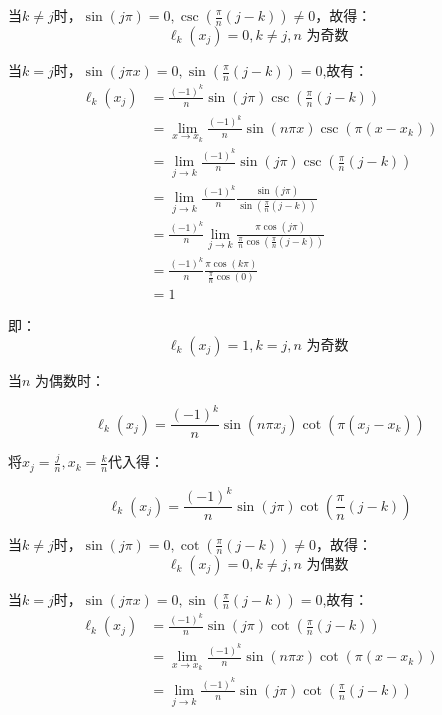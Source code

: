 \documentclass[12pt,a4paper,UTF8]{ctexart}
\theoremstyle{nonumberplain}
\begin{document}
\begin{enumerate}
\begin{enumerate}
\par 当$k \neq j$时，$\sin (j \pi )=0,\csc \left(\frac{\pi}{n}\left(j-k\right)\right)\neq 0$，故得：
$$\ell_{k}\left(x_{j}\right)=0,k \neq j,n \text { 为奇数 }$$
\par 当$k=j$时，$\sin (j \pi x)=0,\sin \left(\frac{\pi}{n}\left(j-k\right)\right)= 0$,故有：
$$\begin{aligned}\ell_{k}\left(x_{j}\right) &=\frac{(-1)^{k}}{n} \sin (j \pi ) \csc \left(\frac{\pi}{n}\left(j-k\right)\right)\\
  &=\lim_{x \to x_{k}}\frac{(-1)^{k}}{n} \sin (n \pi x) \csc \left(\pi\left(x-x_{k}\right)\right)\\
  &=\lim_{j \to k}  \frac{(-1)^{k}}{n} \sin (j \pi ) \csc \left(\frac{\pi}{n}\left(j-k\right)\right)\\
  &=\lim_{j \to k}\frac{(-1)^{k}}{n} \frac{\sin (j \pi )}{ \sin \left(\frac{\pi}{n}\left(j-k\right)\right)}\\
  &=\frac{(-1)^{k}}{n}\lim_{j \to k}\frac{\pi \cos(j\pi)}{\frac{\pi}{n}\cos\left(\frac{\pi}{n}\left(j-k\right)\right)}\\
  &=\frac{(-1)^{k}}{n}\frac{\pi \cos(k\pi)}{\frac{\pi}{n}\cos\left(0\right)}\\
  &=1
\end{aligned}
$$
\par 即：
$$\ell_{k}\left(x_{j}\right)=1,k = j,n \text { 为奇数 }$$
\par 当$n$ 为偶数时：
\par $$\ell_{k}\left(x_{j}\right)=\frac{(-1)^{k}}{n} \sin (n \pi x_{j}) \cot \left(\pi\left(x_{j}-x_{k}\right)\right)$$
\par 将$x_{j}=\frac{j}{n},x_{k}=\frac{k}{n}$代入得：
\par $$\ell_{k}\left(x_{j}\right)=\frac{(-1)^{k}}{n} \sin (j \pi ) \cot \left(\frac{\pi}{n}\left(j-k\right)\right)$$
\par 当$k \neq j$时，$\sin (j \pi )=0,\cot \left(\frac{\pi}{n}\left(j-k\right)\right)\neq 0$，故得：
$$\ell_{k}\left(x_{j}\right)=0,k \neq j, n \text { 为偶数 }$$
\par 当$k=j$时，$\sin (j \pi x)=0,\sin \left(\frac{\pi}{n}\left(j-k\right)\right)= 0$,故有：
$$\begin{aligned}\ell_{k}\left(x_{j}\right) &=\frac{(-1)^{k}}{n} \sin (j \pi ) \cot \left(\frac{\pi}{n}\left(j-k\right)\right)\\
  &=\lim_{x \to x_{k}}\frac{(-1)^{k}}{n} \sin (n \pi x) \cot \left(\pi\left(x-x_{k}\right)\right)\\
  &=\lim_{j \to k}  \frac{(-1)^{k}}{n} \sin (j \pi ) \cot \left(\frac{\pi}{n}\left(j-k\right)\right)\\

\end{aligned}$$
\end{enumerate}
\end{enumerate}
\end{document}
